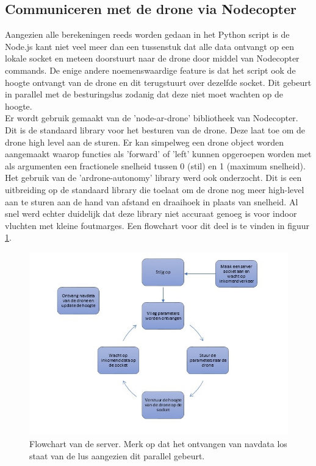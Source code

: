 \subsection{Communiceren met de drone via Nodecopter}
Aangezien alle berekeningen reeds worden gedaan in het Python script is de Node.js kant niet veel meer dan een tussenstuk dat alle data ontvangt op een lokale socket en meteen doorstuurt naar de drone door middel van Nodecopter commands.
De enige andere noemenswaardige feature is dat het script ook de hoogte ontvangt van de drone en dit terugstuurt over dezelfde socket.
Dit gebeurt in parallel met de besturingslus zodanig dat deze niet moet wachten op de hoogte.\\

Er wordt gebruik gemaakt van de 'node-ar-drone' bibliotheek van Nodecopter.
Dit is de standaard library voor het besturen van de drone. Deze laat toe om de drone high level aan de sturen.
Er kan simpelweg een drone object worden aangemaakt waarop functies als 'forward' of 'left' kunnen opgeroepen worden met als argumenten een fractionele snelheid tussen 0 (stil) en 1 (maximum snelheid).\\

Het gebruik van de 'ardrone-autonomy' library werd ook onderzocht. Dit is een uitbreiding op de standaard library die toelaat om de drone nog meer high-level aan te sturen aan de hand van afstand en draaihoek in plaats van snelheid.
Al snel werd echter duidelijk dat deze library niet accuraat genoeg is  voor indoor vluchten met kleine foutmarges.
Een flowchart voor dit deel is te vinden in figuur \ref{fig:flowchart_server}.
\begin{figure}[p]
	\centering
	\includegraphics[width=\textwidth]{images/node_server_flowchart}
	\caption[Flowchart van de server]{Flowchart van de server. Merk op dat het ontvangen van navdata los staat van de lus aangezien dit parallel gebeurt.}
	\label{fig:flowchart_server}
\end{figure}

